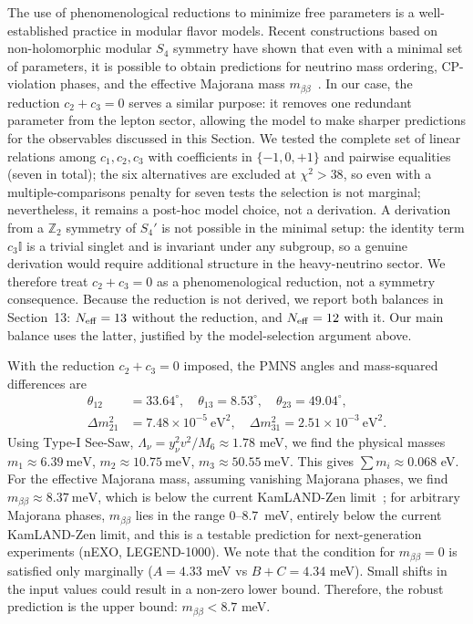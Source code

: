 \documentclass[12pt,a4paper]{article}
\numberwithin{equation}{section}
\begin{document}
The use of phenomenological reductions to minimize free parameters is a well-established practice in modular flavor models. Recent constructions based on non-holomorphic modular \(S_4\) symmetry have shown that even with a minimal set of parameters, it is possible to obtain predictions for neutrino mass ordering, CP-violation phases, and the effective Majorana mass \(m_{\beta\beta}\)~\cite{Ding2025}. In our case, the reduction \(c_2 + c_3 = 0\) serves a similar purpose: it removes one redundant parameter from the lepton sector, allowing the model to make sharper predictions for the observables discussed in this Section. We tested the complete set of linear relations among \(c_1, c_2, c_3\) with coefficients in \(\{-1,0,+1\}\) and pairwise equalities (seven in total); the six alternatives are excluded at \(\chi^2 > 38\), so even with a multiple-comparisons penalty for seven tests the selection is not marginal; nevertheless, it remains a post-hoc model choice, not a derivation. A derivation from a \(\mathbb Z_2\) symmetry of \(S_4'\) is not possible in the minimal setup: the identity term \(c_3\mathbb I\) is a trivial singlet and is invariant under any subgroup, so a genuine derivation would require additional structure in the heavy-neutrino sector. We therefore treat \(c_2 + c_3 = 0\) as a phenomenological reduction, not a symmetry consequence. Because the reduction is not derived, we report both balances in Section~13: \(N_{\rm eff} = 13\) without the reduction, and \(N_{\rm eff} = 12\) with it. Our main balance uses the latter, justified by the model-selection argument above.

With the reduction \(c_2 + c_3 = 0\) imposed, the PMNS angles and mass-squared differences are
\begin{align}
\theta_{12} &= 33.64^\circ, \quad \theta_{13} = 8.53^\circ, \quad \theta_{23} = 49.04^\circ, \\
\Delta m^2_{21} &= 7.48 \times 10^{-5}~\text{eV}^2, \quad \Delta m^2_{31} = 2.51 \times 10^{-3}~\text{eV}^2.
\end{align}
Using Type-I See-Saw, \(\Lambda_\nu = y_\nu^2 v^2 / M_6 \approx 1.78\) meV, we find the physical masses \(m_1 \approx 6.39~\text{meV}\), \(m_2 \approx 10.75~\text{meV}\), \(m_3 \approx 50.55~\text{meV}\). This gives \(\sum m_i \approx 0.068\) eV. For the effective Majorana mass, assuming vanishing Majorana phases, we find \(m_{\beta\beta} \approx 8.37~\text{meV}\), which is below the current KamLAND-Zen limit~\cite{KamLANDZen2023}; for arbitrary Majorana phases, \(m_{\beta\beta}\) lies in the range \(0\)--\(8.7\)~meV, entirely below the current KamLAND-Zen limit, and this is a testable prediction for next-generation experiments (nEXO, LEGEND-1000).
We note that the condition for \(m_{\beta\beta} = 0\) is satisfied only marginally (\(A = 4.33\) meV vs \(B+C = 4.34\) meV). Small shifts in the input values could result in a non-zero lower bound. Therefore, the robust prediction is the upper bound: \(m_{\beta\beta} < 8.7\) meV.
\end{document}
